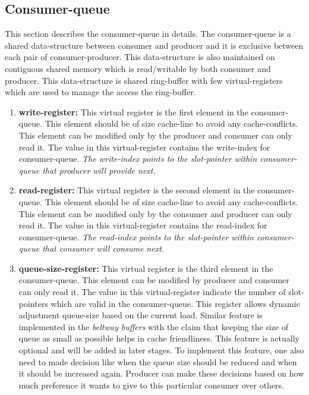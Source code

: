 \documentclass[a4paper,twoside]{report} %
\begin{document}
\subsection{Consumer-queue}
\label{sec:consumer-queue}
This section describes the consumer-queue in details.
The consumer-queue is a shared data-structure between consumer and
producer and it is exclusive between each pair of consumer-producer.
This data-structure is also maintained on contiguous shared memory 
which is read/writable by both consumer and producer.  This
data-structure is shared ring-buffer with few virtual-registers 
which are used to manage the access the ring-buffer.

\begin{enumerate} 
  \item \textbf{write-register:} This virtual register is the first
  element in the consumer-queue.  This element should be of size
  cache-line to avoid any cache-conflicts.  This element can be
  modified only by the producer and consumer can only read it. 
  The value in this virtual-register contains the write-index for
  consumer-queue.  \textit{The write-index points to the slot-pointer within
  consumer-queue that producer will provide next.}

  \item \textbf{read-register:} This virtual register is the second
  element in the consumer-queue.  This element should be of size
  cache-line to avoid any cache-conflicts.  This element can be
  modified only by the consumer and producer can only read it.
  The value in this virtual-register contains the read-index for
  consumer-queue.  \textit{The read-index points to the slot-pointer within
  consumer-queue that consumer will consume next.}

  \item \textbf{queue-size-register:} This virtual register is the third
  element in the consumer-queue.  This element can be modified by
  producer and consumer can only read it.  The value in this
  virtual-register indicate the number of slot-pointers which are
  valid in the consumer-queue.  This register allows dynamic adjustment queue-size
  based on the current load.  Similar feature is implemented in the
  \textit{beltway buffers} with the claim that keeping the size of 
  queue as small as possible helps in cache friendliness.  This
  feature is actually optional and will be added in later stages.
  To implement this feature, one also need to made decision like when
  the queue size should be reduced and when it should be increased
  again.  Producer can make these decisions based on how much
  preference it wants to give to this particular consumer over others.


\end{enumerate}
\end{document}
